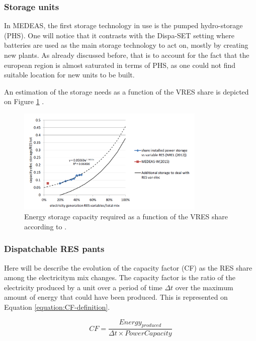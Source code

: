 \subsubsection{Storage units}

In MEDEAS, the first storage technology in use is the pumped hydro-storage (PHS). One will notice that it contrasts with the Dispa-SET setting where batteries are used as the main storage technology to act on, mostly by creating new plants. As already discussed before, that is to account for the fact that the european region is almost saturated in terms of PHS, as one could not find suitable location for new units to be built.

An estimation of the storage needs as a function of the VRES share is depicted on Figure \ref{fig:storage-vres} \cite{NREL}.

\begin{figure}[h]
    \includegraphics[width=0.8\textwidth]{resources/images/storage.png}
    \caption{Energy storage capacity required as a function of the VRES share according to \cite{NREL}.}
    \label{fig:storage-vres}
\end{figure}

\subsubsection{Dispatchable RES pants}

Here will be describe the evolution of the capacity factor (CF) as the RES share among the electricitym mix changes. The capacity factor is the ratio of the electricity produced by a unit over a period of time $\Delta t$ over the maximum amount of energy that could have been produced. This is represented on Equation \ref{equation:CF-definition}.


\begin{equation}
    CF = \frac{Energy_{produced}}{\Delta t \times PowerCapacity}
    \label{equation:CF-definition}
\end{equation}

